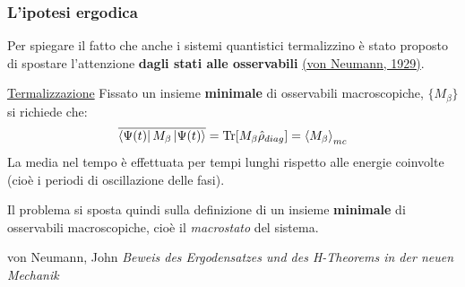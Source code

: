 \documentclass[10pt]{beamer}	%
\theoremstyle{definition}
\theoremstyle{plain}
\begin{document}

%

\begin{frame}
	\frametitle{L'ipotesi ergodica}
	
	Per spiegare il fatto che anche i sistemi quantistici termalizzino è stato proposto di spostare l'attenzione \textbf{dagli stati alle osservabili} \hyperlink{bib}{(von Neumann, 1929)}.
	
	\pause
	\begin{block}{\hyperlink{termdef2}{Termalizzazione}}
		Fissato un insieme \textbf{minimale} di osservabili macroscopiche, $\{ M_\beta \}$ si richiede che:
		\begin{equation*}
			\overline{\bra{\Psi(t)} M_\beta \ket{\Psi(t)}} = \Tr[M_\beta \hat{\rho}_{diag}] = \expval{M_\beta}_{mc}
		\end{equation*}
		{\footnotesize La media nel tempo è effettuata per tempi lunghi rispetto alle energie coinvolte (cioè i periodi di oscillazione delle fasi).}
	\end{block}
	
	\pause
	Il problema si sposta quindi sulla definizione di un insieme \textbf{minimale} di osservabili macroscopiche, cioè il \textit{macrostato} del sistema.
	
	\vfill
	
	\begin{thebibliography}{9}
		von Neumann, John
		\newblock \emph{Beweis des Ergodensatzes und des H-Theorems in der neuen Mechanik}
	\end{thebibliography}
	\vspace*{-25pt}
	
\end{frame}
\end{document}
